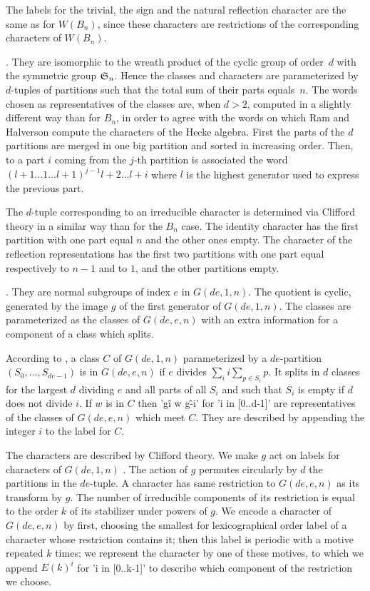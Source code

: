 The  labels for the trivial, the  sign and the natural reflection character
are  the same as  for $W(B_n)$, since  these characters are restrictions of
the corresponding characters of $W(B_n)$.

.
They  are isomorphic to the wreath product of the cyclic group of order~$d$
with  the symmetric  group ${\mathfrak S}_n$.  Hence the  classes and characters are
parameterized  by $d$-tuples of partitions such that the total sum of their
parts  equals~$n$. The words chosen as  representatives of the classes are,
when  $d>2$, computed in a slightly different  way than for $B_n$, in order
to  agree with the words on which  Ram and Halverson compute the characters
of  the Hecke algebra. First the parts  of the $d$ partitions are merged in
one  big partition  and sorted  in increasing  order. Then,  to a  part $i$
coming  from the $j$-th partition is associated the word $(l+1\ldots1\ldots
l+1)^{j-1}l+2\ldots l+i$ where $l$ is the highest generator used to express
the previous part.

The  $d$-tuple corresponding to an  irreducible character is determined via
Clifford  theory in  a similar  way than  for the  $B_n$ case. The identity
character  has the first  partition with one  part equal $n$  and the other
ones  empty. The character of the  reflection representations has the first
two  partitions with one part  equal respectively to $n-1$  and to $1$, and
the other partitions empty.

.
They  are normal  subgroups of  index $e$  in $G(de,1,n)$.  The quotient is
cyclic,  generated by the image $g$  of the first generator of $G(de,1,n)$.
The  classes are parameterized as the  classes of $G(de,e,n)$ with an extra
information for a component of a class which splits.

According  to \cite{Hu85},  a class  $C$ of  $G(de,1,n)$ parameterized by a
$de$-partition  $(S_0,\ldots,S_{de-1})$  is  in  $G(de,e,n)$ if $e$ divides
$\sum_i  i \sum_{p\in S_i}p$. It splits in  $d$ classes for the largest $d$
dividing $e$ and all parts of all $S_i$ and such that $S_i$ is empty if $d$
does  not  divide  $i$.  If  $w$  is  in  $C$ then 'g\^i w g\^-i' for 'i in
[0..d-1]' are representatives of the classes of $G(de,e,n)$ which meet $C$.
They are described by appending the integer $i$ to the label for $C$.

The  characters are described by Clifford theory. We make $g$ act on labels
for  characters of $G(de,1,n)$  . The action  of $g$ permutes circularly by
$d$  the partitions in the $de$-tuple.  A character has same restriction to
$G(de,e,n)$  as its transform by $g$.  The number of irreducible components
of its restriction is equal to the order $k$ of its stabilizer under powers
of  $g$.  We  encode  a  character  of  $G(de,e,n)$  by first, choosing the
smallest  for lexicographical order label  of a character whose restriction
contains  it; then this label is periodic with a motive repeated $k$ times;
we  represent the  character by  one of  these motives,  to which we append
$E(k)^i$ for 'i in [0..k-1]' to describe which component of the restriction
we choose.

